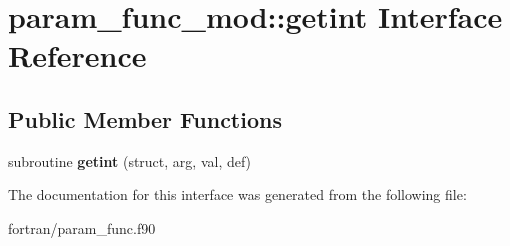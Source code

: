 \hypertarget{interfaceparam__func__mod_1_1getint}{}\section{param\+\_\+func\+\_\+mod\+:\+:getint Interface Reference}
\label{interfaceparam__func__mod_1_1getint}
\subsection*{Public Member Functions}
\begin{DoxyCompactItemize}
\item 
\mbox{\label{interfaceparam__func__mod_1_1getint_a5678057f999b281e6636714b158fd31f}} 
subroutine {\bfseries getint} (struct, arg, val, def)
\end{DoxyCompactItemize}


The documentation for this interface was generated from the following file\+:\begin{DoxyCompactItemize}
\item 
fortran/param\+\_\+func.\+f90\end{DoxyCompactItemize}
